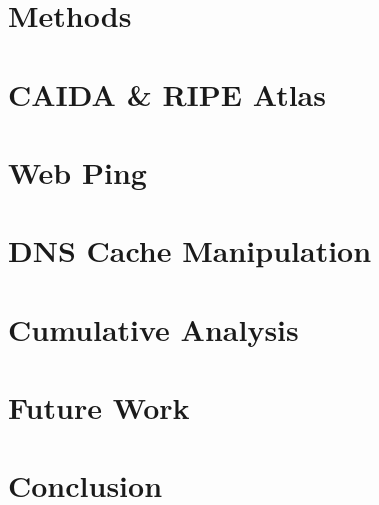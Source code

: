 \documentclass[12pt,oneside,letterpaper]{memoir}
\begin{document}
    \newpage
    \chapter{Methods}\label{sec:methods}
    
    
    
    
    \newpage
    \acresetall
    \chapter{CAIDA \& RIPE Atlas}\label{sec:caida}
    
    
    
    
    
    \newpage
    \chapter{Web Ping}\label{sec:web-ping}
    
    
    
    
    \newpage
    \chapter{DNS Cache Manipulation}\label{sec:dns}
    
    
    
    
    
    \newpage
    \chapter{Cumulative Analysis}\label{sec:results_cumulative}
    
    
    \newpage
    \chapter{Future Work}\label{sec:future_work}
    
    
    \newpage
    \chapter{Conclusion}\label{sec:conclusion}
    
    
    \newpage
    \begin{appendices}
        \newpage
        
    \end{appendices}
\end{document}
